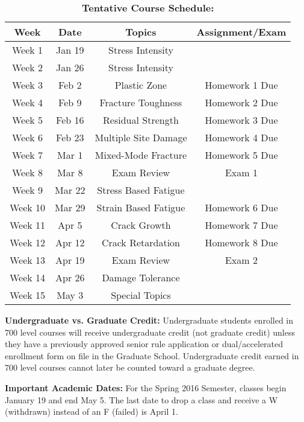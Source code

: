 \documentclass[11pt, a4paper]{article}
\begin{document}
\vspace*{.15in}
\begin{table}
	\captionsetup{singlelinecheck=false,justification=raggedright}
	\caption*{\noindent \textbf{Tentative Course Schedule:}}
	\centering
		\begin{tabular}{cccc}
			\hline
			Week & Date & Topics & Assignment/Exam \\
			\hline
			Week 1 & Jan 19 & Stress Intensity &  \\
			Week 2 & Jan 26 & Stress Intensity & \\
			Week 3 & Feb 2 & Plastic Zone & Homework 1 Due\\
			Week 4 & Feb 9 & Fracture Toughness & Homework 2 Due\\
			Week 5 & Feb 16 & Residual Strength & Homework 3 Due\\
			Week 6 & Feb 23 & Multiple Site Damage & Homework 4 Due\\
			Week 7 & Mar 1 & Mixed-Mode Fracture & Homework 5 Due\\
			Week 8 & Mar 8 & Exam Review & Exam 1 \\
			Week 9 & Mar 22 & Stress Based Fatigue & \\
			Week 10 & Mar 29 & Strain Based Fatigue & Homework 6 Due\\
			Week 11 & Apr 5 & Crack Growth & Homework 7 Due\\
			Week 12 & Apr 12 & Crack Retardation & Homework 8 Due\\
			Week 13 & Apr 19 & Exam Review & Exam 2\\
			Week 14 & Apr 26 & Damage Tolerance & \\
			Week 15 & May 3 & Special Topics & \\
			\hline
		\end{tabular}
\end{table}

\vspace*{.15in}
\noindent\textbf{Undergraduate vs. Graduate Credit:}
Undergraduate students enrolled in 700 level courses will receive undergraduate credit (not graduate credit) unless they have a previously approved senior rule application or dual/accelerated enrollment form on file in the Graduate School. Undergraduate credit earned in 700 level courses cannot later be counted toward a graduate degree.

\vspace*{.15in}
\noindent\textbf{Important Academic Dates:}
For the Spring 2016 Semester, classes begin January 19 and end May 5.
The last date to drop a class and receive a W (withdrawn) instead of an F (failed) is April 1.
\end{document}
